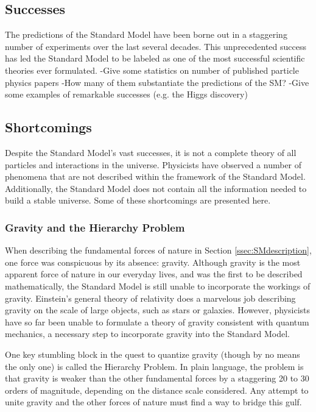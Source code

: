 
\subsection{Successes}
\label{ssec:SMsuccesses}

The predictions of the Standard Model have been borne out in a
staggering number of experiments over the last several decades. This
unprecedented success has led the Standard Model to be labeled as one
of the most successful scientific theories ever formulated. %
-Give some statistics on number of published particle physics papers
-How many of them substantiate the predictions of the SM?
-Give some examples of remarkable successes (e.g. the Higgs discovery)

\subsection{Shortcomings}
\label{ssec:SMshortcomings}

Despite the Standard Model's vast successes, it is not a complete
theory of all particles and interactions in the universe. Physicists
have observed a number of phenomena that are not described within the
framework of the Standard Model. Additionally, the Standard Model does
not contain all the information needed to
build a stable universe. Some of these shortcomings are presented here.

\subsubsection*{Gravity and the Hierarchy Problem}
When describing the fundamental forces of nature in Section
\ref{ssec:SMdescription}, one force was conspicuous by its absence:
gravity. Although gravity is the most apparent force of nature in our
everyday lives, and was the first to be described mathematically,
the Standard Model is still unable to incorporate the workings of
gravity. Einstein's general theory of relativity does a marvelous job
describing gravity on the scale of large objects, such as stars or
galaxies. However, physicists have so far been unable to formulate a
theory of gravity consistent with quantum mechanics, a necessary step
to incorporate gravity into the Standard Model.

One key stumbling block in the quest to quantize gravity (though by no
means the only one) is called the Hierarchy Problem. In plain language, the
problem is that gravity is weaker than the other fundamental forces by
a staggering 20 to 30 orders of magnitude, depending on the distance
scale considered. Any attempt to unite gravity and the other forces
of nature must find a way to bridge this gulf.


